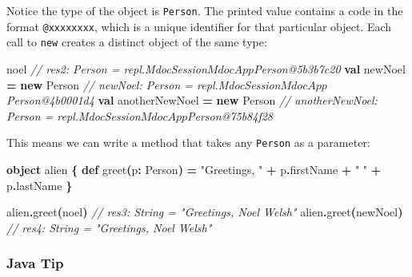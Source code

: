 \documentclass[11pt,a5paper,]{book}
\newenvironment{Shaded}{\begin{snugshade}}{\end{snugshade}}
\newcommand{\CommentTok}[1]{\textcolor[rgb]{0.56,0.35,0.01}{\textit{#1}}}
\newcommand{\FunctionTok}[1]{\textcolor[rgb]{0.00,0.00,0.00}{#1}}
\newcommand{\KeywordTok}[1]{\textcolor[rgb]{0.13,0.29,0.53}{\textbf{#1}}}
\newcommand{\NormalTok}[1]{#1}
\newcommand{\OperatorTok}[1]{\textcolor[rgb]{0.81,0.36,0.00}{\textbf{#1}}}
\newcommand{\StringTok}[1]{\textcolor[rgb]{0.31,0.60,0.02}{#1}}
\begin{document}
Notice the type of the object is \texttt{Person}. The printed value
contains a code in the format \texttt{@xxxxxxxx}, which is a unique
identifier for that particular object. Each call to \texttt{new} creates
a distinct object of the same type:

\begin{Shaded}
\begin{Highlighting}[]
\NormalTok{noel}
\CommentTok{// res2: Person = repl.MdocSession$MdocApp$Person@5b3b7c20}
\KeywordTok{val}\NormalTok{ newNoel }\OperatorTok{=} \KeywordTok{new}\NormalTok{ Person}
\CommentTok{// newNoel: Person = repl.MdocSession$MdocApp$Person@4b0001d4}
\KeywordTok{val}\NormalTok{ anotherNewNoel }\OperatorTok{=} \KeywordTok{new}\NormalTok{ Person}
\CommentTok{// anotherNewNoel: Person = repl.MdocSession$MdocApp$Person@75b84f28}
\end{Highlighting}
\end{Shaded}

This means we can write a method that takes any \texttt{Person} as a
parameter:

\begin{Shaded}
\begin{Highlighting}[]
\KeywordTok{object}\NormalTok{ alien }\OperatorTok{\{}
  \KeywordTok{def} \FunctionTok{greet}\OperatorTok{(}\NormalTok{p}\OperatorTok{:}\NormalTok{ Person}\OperatorTok{)} \OperatorTok{=}
    \StringTok{"Greetings, "} \OperatorTok{+}\NormalTok{ p}\OperatorTok{.}\NormalTok{firstName }\OperatorTok{+} \StringTok{" "} \OperatorTok{+}\NormalTok{ p}\OperatorTok{.}\NormalTok{lastName}
\OperatorTok{\}}
\end{Highlighting}
\end{Shaded}

\begin{Shaded}
\begin{Highlighting}[]
\NormalTok{alien}\OperatorTok{.}\FunctionTok{greet}\OperatorTok{(}\NormalTok{noel}\OperatorTok{)}
\CommentTok{// res3: String = "Greetings, Noel Welsh"}
\NormalTok{alien}\OperatorTok{.}\FunctionTok{greet}\OperatorTok{(}\NormalTok{newNoel}\OperatorTok{)}
\CommentTok{// res4: String = "Greetings, Noel Welsh"}
\end{Highlighting}
\end{Shaded}

\hypertarget{java-tip}{%
\subsubsection*{Java Tip}\label{java-tip}}
\end{document}
